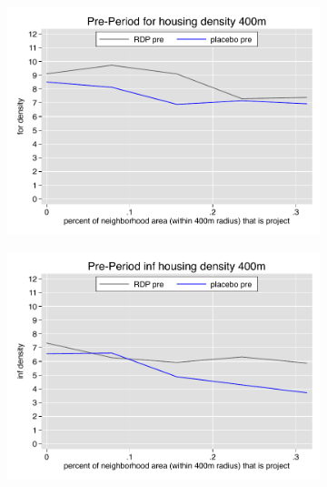 \documentclass[12pt]{article}
\begin{document}
\pagebreak





\begin{figure}
        \begin{subfigure}[b]{0.495\textwidth}
            \centering
            \includegraphics[width=\textwidth,trim={0.3cm .3cm 0.1cm 0cm}, clip=true]{figures/overlap_for_400_total_pre.pdf}
        \end{subfigure}
        \hfill
        \begin{subfigure}[b]{0.495\textwidth}  
            \centering 
            \includegraphics[width=\textwidth,trim={0.3cm .3cm 0.1cm 0cm}, clip=true]{figures/overlap_inf_400_total_pre.pdf}

\end{subfigure}
\end{figure}
\end{document}
